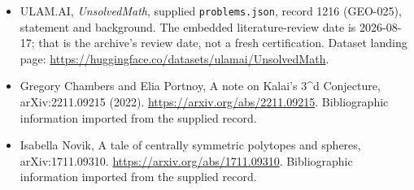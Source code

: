 \documentclass[11pt,a4paper]{article}
\begin{document}
{\small

\begin{itemize}

\item[\hypertarget{source:1216:1}{S1}] ULAM.AI, \emph{UnsolvedMath}, supplied \texttt{problems.json}, record 1216 (GEO-025), statement and background. The embedded literature-review date is 2026-08-17; that is the archive’s review date, not a fresh certification. Dataset landing page: \url{https://huggingface.co/datasets/ulamai/UnsolvedMath}.

\item[\hypertarget{source:1216:2}{S2}] Gregory Chambers and Elia Portnoy, A note on Kalai's 3\textasciicircum{}d Conjecture, arXiv:2211.09215 (2022). \url{https://arxiv.org/abs/2211.09215}. Bibliographic information imported from the supplied record.

\item[\hypertarget{source:1216:3}{S3}] Isabella Novik, A tale of centrally symmetric polytopes and spheres, arXiv:1711.09310. \url{https://arxiv.org/abs/1711.09310}. Bibliographic information imported from the supplied record.

\end{itemize}

}

\label{end:1216}
\end{document}
